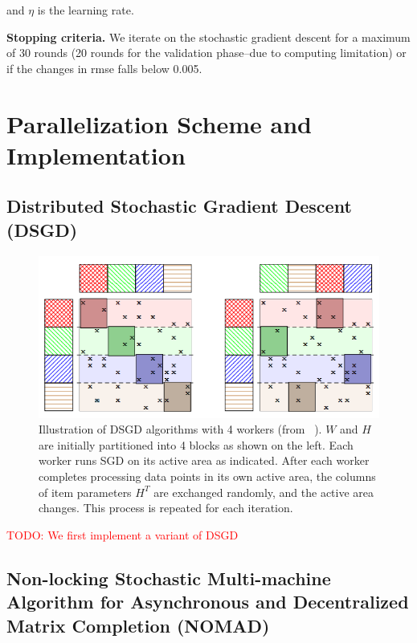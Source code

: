 \documentclass{article} %
\newcommand{\todo}[1]{\textcolor{red}{TODO: #1}}
\begin{document}
\begin{center}
and $\eta$ is the learning rate.
\end{center}

\textbf{Stopping criteria.}   We iterate on the stochastic gradient descent
for a maximum of 30 rounds (20 rounds for the validation phase--due to
computing limitation)   or if the changes in rmse falls below 0.005.

\section{Parallelization Scheme and Implementation}


\subsection{Distributed Stochastic Gradient Descent (DSGD)}

\begin{figure}[ht]
\centering
\includegraphics[width=0.5\linewidth]{figures/dsgd}
\caption{\label{fig:dsgdnomad} Illustration of DSGD algorithms with 4 workers (from ~\cite{yun2013nomad}).
$W$ and $H$ are initially partitioned into 4 blocks as shown on the left. Each worker runs SGD on its active area as indicated. After each
worker completes processing data points in its own active
area, the columns of item parameters $H^T$ are exchanged
randomly, and the active area changes. This process is repeated
for each iteration.}

\end{figure}

\todo{We first implement a variant of DSGD\cite{gemulla2011large}}

\subsection{Non-locking Stochastic Multi-machine Algorithm for Asynchronous and Decentralized Matrix Completion (NOMAD)}
\end{document}
